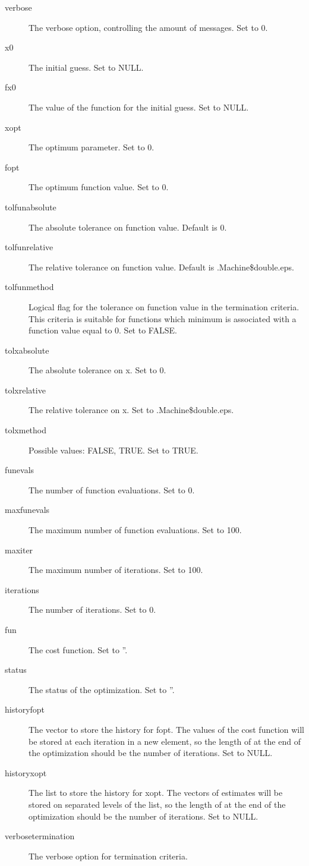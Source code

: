 \begin{Value}
\begin{description}
\begin{description}
\item[verbose] The verbose option, controlling the amount of messages.
Set to 0.
\item[x0] The initial guess. Set to NULL.
\item[fx0] The value of the function for the initial guess. Set to
NULL.
\item[xopt] The optimum parameter. Set to 0.
\item[fopt] The optimum function value. Set to 0.
\item[tolfunabsolute] The absolute tolerance on function value. Default
is 0.
\item[tolfunrelative] The relative tolerance on function value. Default   
is .Machine\$double.eps.
\item[tolfunmethod] Logical flag for the tolerance on function value in
the termination criteria. This criteria is suitable for functions which
minimum is associated with a function value equal to 0. Set to FALSE.
\item[tolxabsolute] The absolute tolerance on x. Set to 0.
\item[tolxrelative] The relative tolerance on x. Set to
.Machine\$double.eps.
\item[tolxmethod] Possible values: FALSE, TRUE. Set to TRUE.
\item[funevals] The number of function evaluations. Set to 0.
\item[maxfunevals] The maximum number of function evaluations. Set to
100.
\item[maxiter] The maximum number of iterations. Set to 100.
\item[iterations] The number of iterations. Set to 0.
\item[fun] The cost function. Set to ''.
\item[status] The status of the optimization. Set to ''.
\item[historyfopt] The vector to store the history for fopt. The values of
the cost function will be stored at each iteration in a new element, so
the length of  at the end of the optimization should
be the number of iterations. Set to NULL.
\item[historyxopt] The list to store the history for xopt. The vectors of 
estimates will be stored on separated levels of the list, so the length
of  at the end of the optimization should be the
number of iterations. Set to NULL.
\item[verbosetermination] The verbose option for termination criteria. 

\end{description}
\end{description}
\end{Value}
